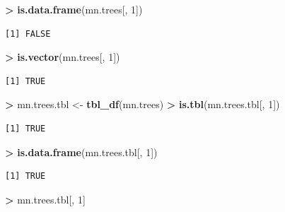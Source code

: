 \documentclass[]{krantz}
\makeatletter
\newenvironment{Shaded}{\begin{snugshade}}{\end{snugshade}}
\newcommand{\KeywordTok}[1]{\textcolor[rgb]{0.27,0.27,0.27}{\textbf{#1}}}
\newcommand{\DecValTok}[1]{\textcolor[rgb]{0.06,0.06,0.06}{#1}}
\newcommand{\StringTok}[1]{\textcolor[rgb]{0.5,0.5,0.5}{#1}}
\newcommand{\OperatorTok}[1]{\textcolor[rgb]{0.43,0.43,0.43}{\textbf{#1}}}
\newcommand{\NormalTok}[1]{#1}
\newenvironment{kframe}{%
\medskip{}
\setlength{\fboxsep}{.8em}
 \def\at@end@of@kframe{}%
 \ifinner\ifhmode%
  \def\at@end@of@kframe{\end{minipage}}%
  \begin{minipage}{\columnwidth}%
 \fi\fi%
 \def\FrameCommand##1{\hskip\@totalleftmargin \hskip-\fboxsep
 \colorbox{shadecolor}{##1}\hskip-\fboxsep
     \hskip-\linewidth \hskip-\@totalleftmargin \hskip\columnwidth}%
 \MakeFramed {\advance\hsize-\width
   \@totalleftmargin\z@ \linewidth\hsize
   \@setminipage}}%
 {\par\unskip\endMakeFramed%
 \at@end@of@kframe}
\renewenvironment{Shaded}{\begin{kframe}}{\end{kframe}}
\theoremstyle{definition}
\theoremstyle{definition}
\theoremstyle{definition}
\theoremstyle{remark}
\makeatother
\begin{document}
\begin{Shaded}
\begin{Highlighting}[]
\OperatorTok{>}\StringTok{ }\KeywordTok{is.data.frame}\NormalTok{(mn.trees[, }\DecValTok{1}\NormalTok{])}
\end{Highlighting}
\end{Shaded}

\begin{verbatim}
[1] FALSE
\end{verbatim}

\begin{Shaded}
\begin{Highlighting}[]
\OperatorTok{>}\StringTok{ }\KeywordTok{is.vector}\NormalTok{(mn.trees[, }\DecValTok{1}\NormalTok{])}
\end{Highlighting}
\end{Shaded}

\begin{verbatim}
[1] TRUE
\end{verbatim}

\begin{Shaded}
\begin{Highlighting}[]
\OperatorTok{>}\StringTok{ }\NormalTok{mn.trees.tbl <-}\StringTok{ }\KeywordTok{tbl_df}\NormalTok{(mn.trees)}
\OperatorTok{>}\StringTok{ }\KeywordTok{is.tbl}\NormalTok{(mn.trees.tbl[, }\DecValTok{1}\NormalTok{])}
\end{Highlighting}
\end{Shaded}

\begin{verbatim}
[1] TRUE
\end{verbatim}

\begin{Shaded}
\begin{Highlighting}[]
\OperatorTok{>}\StringTok{ }\KeywordTok{is.data.frame}\NormalTok{(mn.trees.tbl[, }\DecValTok{1}\NormalTok{])}
\end{Highlighting}
\end{Shaded}

\begin{verbatim}
[1] TRUE
\end{verbatim}

\begin{Shaded}
\begin{Highlighting}[]
\OperatorTok{>}\StringTok{ }\NormalTok{mn.trees.tbl[, }\DecValTok{1}\NormalTok{]}
\end{Highlighting}
\end{Shaded}
\end{document}
